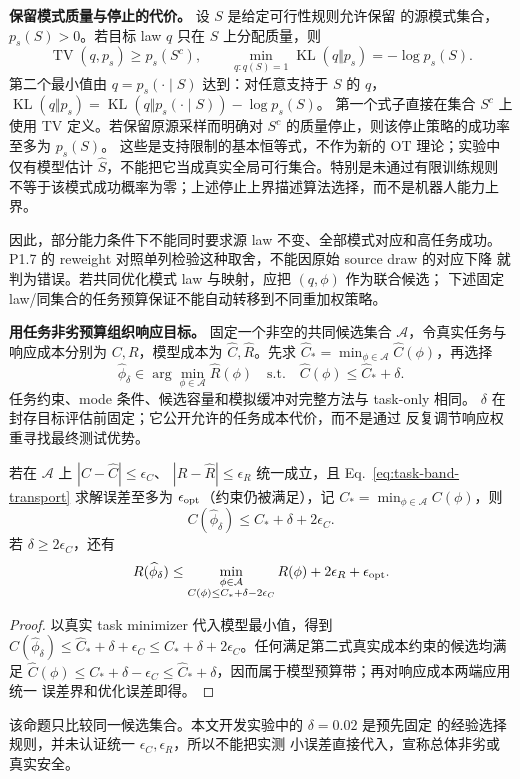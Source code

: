 \textbf{保留模式质量与停止的代价。} 设 $S$ 是给定可行性规则允许保留
的源模式集合，$p_s(S)>0$。若目标 law $q$ 只在 $S$ 上分配质量，则
\[
 \operatorname{TV}(q,p_s)\ge p_s(S^c),\qquad
 \min_{q:q(S)=1}\operatorname{KL}(q\Vert p_s)=-\log p_s(S).
\]
第二个最小值由 $q=p_s(\cdot\mid S)$ 达到：对任意支持于 $S$ 的 $q$，
$\operatorname{KL}(q\Vert p_s)=
\operatorname{KL}(q\Vert p_s(\cdot\mid S))-\log p_s(S)$。
第一个式子直接在集合 $S^c$ 上使用 TV 定义。若保留原源采样而明确对
$S^c$ 的质量停止，则该停止策略的成功率至多为 $p_s(S)$。
这些是支持限制的基本恒等式，不作为新的 OT 理论；实验中仅有模型估计
$\widehat S$，不能把它当成真实全局可行集合。特别是未通过有限训练规则
不等于该模式成功概率为零；上述停止上界描述算法选择，而不是机器人能力上界。

因此，部分能力条件下不能同时要求源 law 不变、全部模式对应和高任务成功。
P1.7 的 reweight 对照单列检验这种取舍，不能因原始 source draw 的对应下降
就判为错误。若共同优化模式 law 与映射，应把 $(q,\phi)$ 作为联合候选；
下述固定 law/同集合的任务预算保证不能自动转移到不同重加权策略。

\textbf{用任务非劣预算组织响应目标。} 固定一个非空的共同候选集合
$\mathcal A$，令真实任务与响应成本分别为 $C,R$，模型成本为
$\widehat C,\widehat R$。先求 $\widehat C_*=\min_{\phi\in\mathcal A}
\widehat C(\phi)$，再选择
\begin{equation}
 \widehat\phi_\delta\in\arg\min_{\phi\in\mathcal A}\widehat R(\phi)
 \quad\text{s.t.}\quad
 \widehat C(\phi)\le\widehat C_*+\delta.
 \label{eq:task-band-transport}
\end{equation}
任务约束、mode 条件、候选容量和模拟缓冲对完整方法与 task-only 相同。
$\delta$ 在封存目标评估前固定；它公开允许的任务成本代价，而不是通过
反复调节响应权重寻找最终测试优势。

\begin{proposition}[同一有限集合内的任务预算与响应比较]
若在 $\mathcal A$ 上 $|C-\widehat C|\le\epsilon_C$、
$|R-\widehat R|\le\epsilon_R$ 统一成立，且 Eq.~\eqref{eq:task-band-transport}
求解误差至多为 $\epsilon_{\rm opt}$（约束仍被满足），记
$C_*=\min_{\phi\in\mathcal A}C(\phi)$，则
\begin{equation}
 C(\widehat\phi_\delta)\le C_*+\delta+2\epsilon_C.
\end{equation}
若 $\delta\ge2\epsilon_C$，还有
\begin{equation}
 R(\widehat\phi_\delta)\le
 \min_{\substack{\phi\in\mathcal A\\C(\phi)\le C_*+\delta-2\epsilon_C}}
 R(\phi)+2\epsilon_R+\epsilon_{\rm opt}.
\end{equation}
\end{proposition}
\begin{proof}
以真实 task minimizer 代入模型最小值，得到
$C(\widehat\phi_\delta)\le\widehat C_*+\delta+\epsilon_C
\le C_*+\delta+2\epsilon_C$。任何满足第二式真实成本约束的候选均满足
$\widehat C(\phi)\le C_*+\delta-\epsilon_C
\le\widehat C_*+\delta$，因而属于模型预算带；再对响应成本两端应用统一
误差界和优化误差即得。
\end{proof}
该命题只比较同一候选集合。本文开发实验中的 $\delta=0.02$ 是预先固定
的经验选择规则，并未认证统一 $\epsilon_C,\epsilon_R$，所以不能把实测
小误差直接代入，宣称总体非劣或真实安全。

